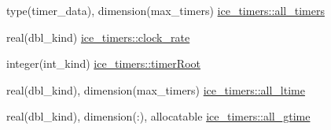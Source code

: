 \begin{DoxyCompactItemize}
type(timer\_\-data), dimension(max\_\-timers) \hyperlink{namespaceice__timers_a7bda531f2d88a00f031b6d6f8f104474}{ice\_\-timers::all\_\-timers}
\item 
real(dbl\_\-kind) \hyperlink{namespaceice__timers_a6e77da30d9249c18d6b65ff45dc46ea4}{ice\_\-timers::clock\_\-rate}
\item 
integer(int\_\-kind) \hyperlink{namespaceice__timers_a1659ba1f7b638e76d301c36b9b061f85}{ice\_\-timers::timerRoot}
\item 
real(dbl\_\-kind), dimension(max\_\-timers) \hyperlink{namespaceice__timers_a3974283b5a3de2b611895ae971fb9b86}{ice\_\-timers::all\_\-ltime}
\item 
real(dbl\_\-kind), dimension(:), allocatable \hyperlink{namespaceice__timers_ac5562b4ab5e728d8135200ab10795610}{ice\_\-timers::all\_\-gtime}
\end{DoxyCompactItemize}
